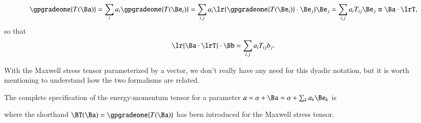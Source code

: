 \begin{dmath}\label{eqn:poyntingF:1140}
\gpgradeone{ T(\Ba) }
=
\sum_i a_i \gpgradeone{ T(\Be_i) }
=
\sum_{i,j} a_i \lr{ \gpgradeone{ T(\Be_i) } \cdot \Be_j } \Be_j
=
\sum_{i,j} a_i T_{ij} \Be_j
\equiv
\Ba \cdot \lrT,
\end{dmath}
so that
\begin{dmath}\label{eqn:poyntingF:1160}
\lr{ \Ba \cdot \lrT } \cdot \Bb
=
\sum_{i,j} a_i T_{ij} b_j.
\end{dmath}

With the Maxwell stress tensor parameterized by a vector, we don't really have any need for this dyadic notation, but it is worth mentioning to
understand how the two formalisms are related.

The complete specification of the energy-momentum tensor for a parameter \( a = \alpha + \Ba = \alpha + \sum_k a_k \Be_k \) is

where the shorthand \( \BT(\Ba) = \gpgradeone{T(\Ba)} \) has been introduced for the Maxwell stress tensor.
